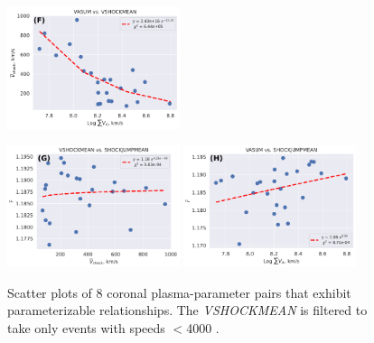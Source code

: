 \begin{figure}[!htp]
{		\includegraphics[width=0.45\textwidth]{chapter2/figs/VASUM_VSHOCKMEAN.pdf}
	}
	\centerline{
		\includegraphics[width=0.45\textwidth]{chapter2/figs/VSHOCKMEAN_SHOCKJUMPMEAN.pdf}
		\includegraphics[width=0.45\textwidth]{chapter2/figs/VASUM_SHOCKJUMPMEAN.pdf}
	}
	\caption{Scatter plots of 8 coronal plasma-parameter pairs that exhibit parameterizable relationships. The \textit{VSHOCKMEAN} is filtered to take only events with speeds $<$4000 \kms.}
	\label{fig_scatterplot_plasma_param}
\end{figure}


